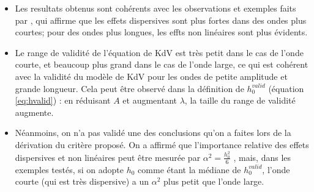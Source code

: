 \begin{itemize}
 \item Les resultats obtenus sont cohérents avec les observations et exemples faits par \cite{conservationLaws2002}, qui affirme que les effets dispersives sont plus fortes dans des ondes plus courtes; pour des ondes plus longues, les effts non linéaires sont plus évidents.
 \item Le range de validité de l'équation de KdV est très petit dans le cas de l'onde courte, et beaucoup plus grand dans le cas de l'onde large, ce qui est cohérent avec la validité du modèle de KdV pour les ondes de petite amplitude et grande longueur. Cela peut être observé dans la définition de $h_0^{valid}$ (équation \eqref{eq:hvalid}) : en réduisant $A$ et augmentant $\lambda$, la taille du range de validité augmente.
 \item Néanmoins, on n'a pas validé une des conclusions qu'on a faites lors de la dérivation du critère proposé. On a affirmé que l'importance relative des effets dispersives et non linéaires peut être mesurée par $\alpha^2 = \frac{h_0^2}{6}$ , mais, dans les exemples testés, si on adopte $h_0$ comme étant la médiane de $ h_0^{valid} $, l'onde courte (qui est très dispersive) a un $\alpha^2$ plus petit que l'onde large.
\end{itemize} 
